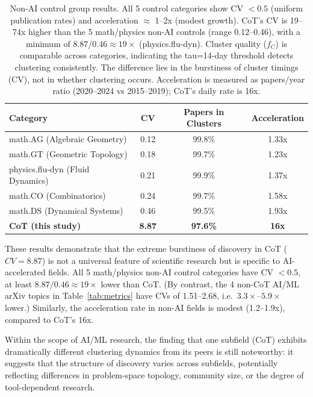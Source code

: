 \documentclass[12pt]{article}
\begin{document}
\begin{table}[t]
\centering
\begin{tabular}{lccc}
\toprule
\textbf{Category} & \textbf{CV} & \textbf{Papers in Clusters} & \textbf{Acceleration} \\
\midrule
math.AG (Algebraic Geometry) & 0.12 & 99.8\% & 1.33x \\
math.GT (Geometric Topology) & 0.18 & 99.7\% & 1.23x \\
physics.flu-dyn (Fluid Dynamics) & 0.21 & 99.9\% & 1.37x \\
math.CO (Combinatorics) & 0.24 & 99.7\% & 1.58x \\
math.DS (Dynamical Systems) & 0.46 & 99.5\% & 1.93x \\
\midrule
\textbf{CoT (this study)} & \textbf{8.87} & \textbf{97.6\%} & \textbf{16x} \\
\bottomrule
\end{tabular}
\caption{Non-AI control group results. All 5 control categories show CV $< 0.5$ (uniform publication rates) and acceleration $\approx$ 1--2x (modest growth). CoT's CV is 19--74x higher than the 5 math/physics non-AI controls (range 0.12--0.46), with a minimum of $8.87/0.46 \approx 19\times$ (physics.flu-dyn). Cluster quality ($f_C$) is comparable across categories, indicating the tau=14-day threshold detects clustering consistently. The difference lies in the burstiness of cluster timings (CV), not in whether clustering occurs. Acceleration is measured as papers/year ratio (2020--2024 vs 2015--2019); CoT's daily rate is 16x.}
\label{tab:non-ai-controls}
\end{table}

These results demonstrate that the extreme burstiness of discovery in CoT ($CV = 8.87$) is not a universal feature of scientific research but is specific to AI-accelerated fields. All 5 math/physics non-AI control categories have CV $< 0.5$, at least $8.87/0.46 \approx 19\times$ lower than CoT. (By contrast, the 4 non-CoT AI/ML arXiv topics in Table~\ref{tab:metrics} have CVs of 1.51--2.68, i.e.\ $3.3\times$--$5.9\times$ lower.) Similarly, the acceleration rate in non-AI fields is modest (1.2--1.9x), compared to CoT's 16x.

Within the scope of AI/ML research, the finding that one subfield (CoT) exhibits dramatically different clustering dynamics from its peers is still noteworthy: it suggests that the structure of discovery varies across subfields, potentially reflecting differences in problem-space topology, community size, or the degree of tool-dependent research.
\end{document}
